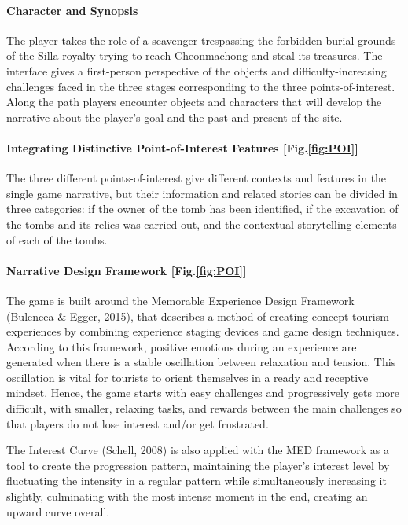 \documentclass[runningheads]{llncs}
\begin{document}
\paragraph{Character and Synopsis} The player takes the role of a scavenger trespassing the forbidden burial grounds of the Silla royalty trying to reach Cheonmachong and steal its treasures. The interface gives a first-person perspective of the objects and difficulty-increasing challenges faced in the three stages corresponding to the three points-of-interest. Along the path players encounter objects and characters that will develop the narrative about the player's goal and the past and present of the site.
\paragraph{Integrating Distinctive Point-of-Interest Features [Fig.\ref{fig:POI}]} The three different points-of-interest give different contexts and features in the single game narrative, but their information and related stories can be divided in three categories: if the owner of the tomb has been identified, if the excavation of the tombs and its relics was carried out, and the contextual storytelling elements of each of the tombs.

\paragraph{Narrative Design Framework [Fig.\ref{fig:POI}]} The game is built around the Memorable Experience Design Framework (Bulencea \& Egger, 2015), that describes a method of creating concept tourism experiences by combining experience staging devices and game design techniques. According to this framework, positive emotions during an experience are generated when there is a stable oscillation between relaxation and tension. This oscillation is vital for tourists to orient themselves in a ready and receptive mindset. Hence, the game starts with easy challenges and progressively gets more difficult, with smaller, relaxing tasks, and rewards between the main challenges so that players do not lose interest and/or get frustrated.
\par The Interest Curve (Schell, 2008) is also applied with the MED framework as a tool to create the progression pattern, maintaining the player's interest level by fluctuating the intensity in a regular pattern while simultaneously increasing it slightly, culminating with the most intense moment in the end, creating an upward curve overall.
\end{document}
